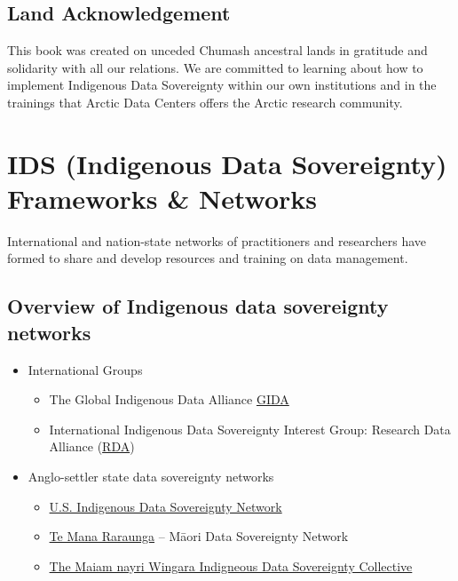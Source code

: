 \documentclass[
]{book}
\providecommand{\tightlist}{%
  \setlength{\itemsep}{0pt}\setlength{\parskip}{0pt}}
\begin{document}
\hypertarget{land-acknowledgement}{%
\section*{Land Acknowledgement}\label{land-acknowledgement}}

This book was created on unceded Chumash ancestral lands in gratitude and solidarity with all our relations. We are committed to learning about how to implement Indigenous Data Sovereignty within our own institutions and in the trainings that Arctic Data Centers offers the Arctic research community.

\hypertarget{ids-indigenous-data-sovereignty-frameworks-networks}{%
\chapter{IDS (Indigenous Data Sovereignty) Frameworks \& Networks}\label{ids-indigenous-data-sovereignty-frameworks-networks}}

International and nation-state networks of practitioners and researchers have formed to share and develop resources and training on data management.

\hypertarget{overview-of-indigenous-data-sovereignty-networks}{%
\section*{Overview of Indigenous data sovereignty networks}\label{overview-of-indigenous-data-sovereignty-networks}}

\begin{itemize}
\tightlist
\item
  International Groups

  \begin{itemize}
  \tightlist
  \item
    The Global Indigenous Data Alliance \href{https://www.gida-global.org/}{GIDA}
  \item
    International Indigenous Data Sovereignty Interest Group: Research Data Alliance (\href{https://www.rd-alliance.org/groups/international-indigenous-data-sovereignty-ig}{RDA})
  \end{itemize}
\item
  Anglo-settler state data sovereignty networks

  \begin{itemize}
  \tightlist
  \item
    \href{https://usindigenousdata.org/}{U.S. Indigenous Data Sovereignty Network}
  \item
    \href{https://www.temanararaunga.maori.nz/}{Te Mana Raraunga} -- Māori Data Sovereignty Network
  \item
    \href{https://www.maiamnayriwingara.org/}{The Maiam nayri Wingara Indigneous Data Sovereignty Collective}
  \end{itemize}
\end{itemize}
\end{document}

